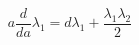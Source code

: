 \begin{equation}
a\frac d {da} \lambda_1=d\lambda_1+\frac {\lambda_1\lambda_2} 2
\label{onepoint}
\end{equation}

